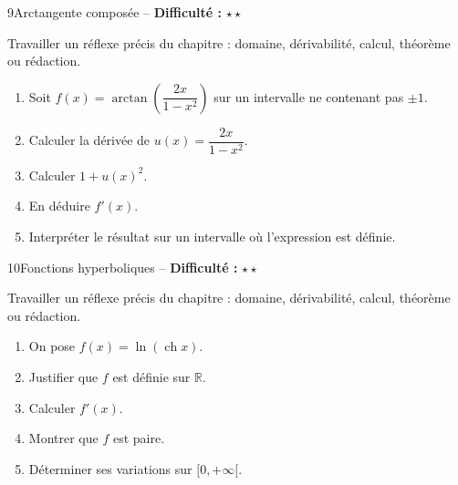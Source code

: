 \documentclass[11pt,a4paper]{article}
\newcommand{\R}{\mathbb{R}}
\newcommand{\ch}{\operatorname{ch}}
\newcommand{\etoiles}[1]{\textbf{Difficulté :} #1}
\begin{document}
\begin{exobox}{9}{Arctangente composée -- \etoiles{$\star\star$}}

\begin{objectifbox}
Travailler un réflexe précis du chapitre : domaine, dérivabilité, calcul, théorème ou rédaction.
\end{objectifbox}

\begin{enumerate}

\item Soit $f(x)=\arctan\left(\dfrac{2x}{1-x^2}\right)$ sur un intervalle ne contenant pas $\pm1$.

\item Calculer la dérivée de $u(x)=\dfrac{2x}{1-x^2}$.

\item Calculer $1+u(x)^2$.

\item En déduire $f'(x)$.

\item Interpréter le résultat sur un intervalle où l'expression est définie.

\end{enumerate}

\end{exobox}


\begin{exobox}{10}{Fonctions hyperboliques -- \etoiles{$\star\star$}}

\begin{objectifbox}
Travailler un réflexe précis du chapitre : domaine, dérivabilité, calcul, théorème ou rédaction.
\end{objectifbox}

\begin{enumerate}

\item On pose $f(x)=\ln(\ch x)$.

\item Justifier que $f$ est définie sur $\R$.

\item Calculer $f'(x)$.

\item Montrer que $f$ est paire.

\item Déterminer ses variations sur $[0,+\infty[$.

\end{enumerate}

\end{exobox}
\end{document}

